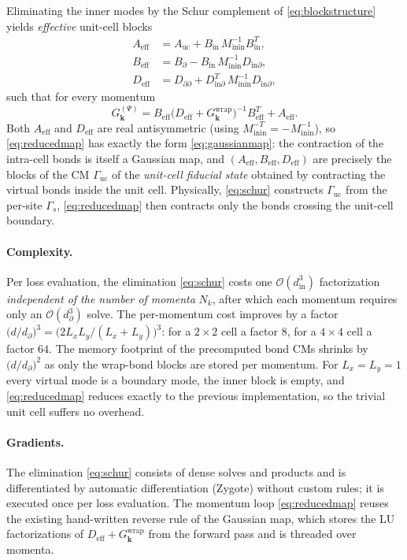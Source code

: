 \documentclass[11pt,a4paper]{article}
\newcommand{\uc}{\mathrm{uc}}
\newcommand{\Guc}{\Gamma_{\uc}}
\newcommand{\bdry}{\partial}
\newcommand{\inn}{\mathrm{in}}
\begin{document}
Eliminating the inner modes by the Schur complement of
\eqref{eq:blockstructure} yields \emph{effective} unit-cell blocks
\begin{equation}
  \boxed{\;
  \begin{aligned}
    A_{\mathrm{eff}} &= A_{\uc} + B_\inn\, M_{\inn\inn}^{-1} B_\inn^{T} ,\\
    B_{\mathrm{eff}} &= B_\bdry - B_\inn\, M_{\inn\inn}^{-1} D_{\inn\bdry} ,\\
    D_{\mathrm{eff}} &= D_{\bdry\bdry} + D_{\inn\bdry}^{T}\, M_{\inn\inn}^{-1} D_{\inn\bdry} ,
  \end{aligned}\;}
  \label{eq:schur}
\end{equation}
such that for every momentum
\begin{equation}
  G^{(\Psi)}_{\bm k}
  = B_{\mathrm{eff}} \big( D_{\mathrm{eff}} + G^{\mathrm{wrap}}_{\bm k} \big)^{-1}
    B_{\mathrm{eff}}^{T} + A_{\mathrm{eff}} .
  \label{eq:reducedmap}
\end{equation}
Both $A_{\mathrm{eff}}$ and $D_{\mathrm{eff}}$ are real antisymmetric (using
$M_{\inn\inn}^{-T} = -M_{\inn\inn}^{-1}$), so
\eqref{eq:reducedmap} has exactly the form \eqref{eq:gaussianmap}: the
contraction of the intra-cell bonds is itself a Gaussian map, and
$(A_{\mathrm{eff}}, B_{\mathrm{eff}}, D_{\mathrm{eff}})$ are precisely the
blocks of the CM $\Guc$ of the \emph{unit-cell fiducial state} obtained by
contracting the virtual bonds inside the unit cell. 
Physically, \eqref{eq:schur} constructs
$\Guc$ from the per-site $\Gamma_s$, \eqref{eq:reducedmap} then contracts
only the bonds crossing the unit-cell boundary.

\paragraph{Complexity.} Per loss evaluation, the elimination
\eqref{eq:schur} costs one $\mathcal{O}(d_\inn^3)$ factorization
\emph{independent of the number of momenta} $N_k$, after which each
momentum requires only an $\mathcal{O}(d_\bdry^3)$ solve. The per-momentum
cost improves by a factor $\big(d / d_\bdry\big)^3 = \big(2 L_x L_y /
(L_x + L_y)\big)^3$: for a $2\times 2$ cell a factor $8$, for a
$4 \times 4$ cell a factor $64$. The memory footprint of the precomputed
bond CMs shrinks by $\big(d/d_\bdry\big)^2$ as only the wrap-bond blocks
are stored per momentum. For $L_x = L_y = 1$ every virtual mode is a
boundary mode, the inner block is empty, and
\eqref{eq:reducedmap} reduces exactly to the previous implementation, so
the trivial unit cell suffers no overhead.

\paragraph{Gradients.} The elimination \eqref{eq:schur} consists of dense
solves and products and is differentiated by automatic differentiation
(Zygote) without custom rules; it is executed once per loss evaluation. The
momentum loop \eqref{eq:reducedmap} reuses the existing hand-written
reverse rule of the Gaussian map, which stores the LU factorizations of
$D_{\mathrm{eff}} + G^{\mathrm{wrap}}_{\bm k}$ from the forward pass and is
threaded over momenta.
\end{document}
